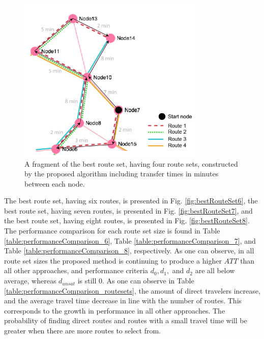 \begin{figure}[H]
    \begin{center}
    \includegraphics[width=3.5in]{assets/mandl_withTT_utsnitt.png}
    \end{center}
    \caption{A fragment of the best route set, having four route sets, constructed by the proposed algorithm including transfer times in minutes between each node.}
    \label{fig:mandlWithTT} 
\end{figure}

The best route set, having six routes, is presented in Fig. \vref{fig:bestRouteSet6}, the best route set, having seven routes, is presented in Fig. \vref{fig:bestRouteSet7}, and the best route set, having eight routes, is presented in Fig. \vref{fig:bestRouteSet8}. The performance comparison for each route set size is found in Table \vref{table:performanceComparison_6}, Table \vref{table:performanceComparison_7}, and Table \vref{table:performanceComparison_8}, respectively. As one can observe, in all route set sizes the proposed method is continuing to produce a higher $ATT$ than all other approaches, and performance criteria $d_0, d_1,$ and $d_{2}$ are all below average, whereas $d_{unsat}$ is still 0. %
As one can observe in Table \vref{table:performanceComparison_routesets}, the amount of direct travelers increase, and the average travel time decrease in line with the number of routes. This corresponds to the growth in performance in all other approaches. The probability of finding direct routes and routes with a small travel time will be greater when there are more routes to select from. 

